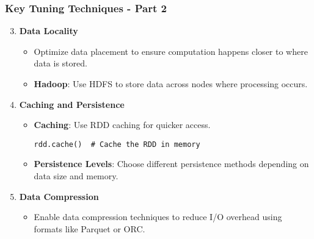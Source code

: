 \documentclass[aspectratio=169]{beamer}
\begin{document}
\begin{frame}[fragile]
    \frametitle{Key Tuning Techniques - Part 2}
    \begin{enumerate}
        \setcounter{enumi}{2} %
        \item \textbf{Data Locality}
        \begin{itemize}
            \item Optimize data placement to ensure computation happens closer to where data is stored.
            \item \textbf{Hadoop}: Use HDFS to store data across nodes where processing occurs.
        \end{itemize}

        \item \textbf{Caching and Persistence}
        \begin{itemize}
            \item \textbf{Caching}: Use RDD caching for quicker access.
            \begin{lstlisting}
rdd.cache()  # Cache the RDD in memory
            \end{lstlisting}
            \item \textbf{Persistence Levels}: Choose different persistence methods depending on data size and memory.
        \end{itemize}

        \item \textbf{Data Compression}
        \begin{itemize}
            \item Enable data compression techniques to reduce I/O overhead using formats like Parquet or ORC.
        \end{itemize}
    \end{enumerate}
\end{frame}
\end{document}
